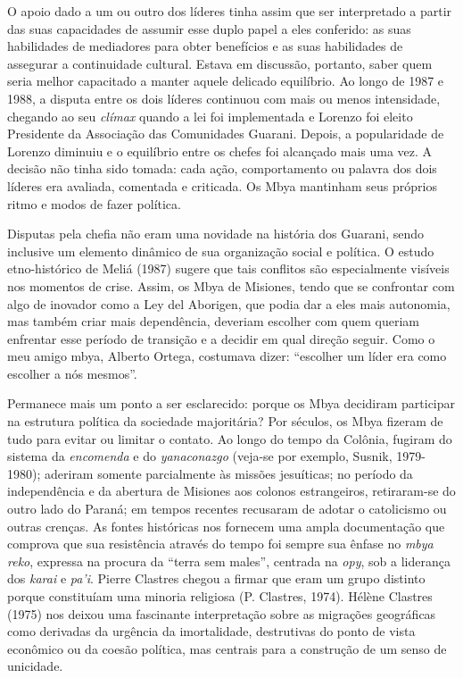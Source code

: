 O apoio dado a um ou outro dos líderes tinha assim que ser interpretado
a partir das suas capacidades de assumir esse duplo papel a eles
conferido: as suas habilidades de mediadores para obter benefícios e as
suas habilidades de assegurar a continuidade cultural. Estava em
discussão, portanto, saber quem seria melhor capacitado a manter aquele
delicado equilíbrio. Ao longo de 1987 e 1988, a disputa entre os dois
líderes continuou com mais ou menos intensidade, chegando ao seu
\emph{clímax} quando a lei foi implementada e Lorenzo foi eleito
Presidente da Associação das Comunidades Guarani. Depois, a popularidade
de Lorenzo diminuiu e o equilíbrio entre os chefes foi alcançado mais
uma vez. A decisão não tinha sido tomada: cada ação, comportamento ou
palavra dos dois líderes era avaliada, comentada e criticada. Os Mbya
mantinham seus próprios ritmo e modos de fazer política.

Disputas pela chefia não eram uma novidade na história dos Guarani,
sendo inclusive um elemento dinâmico de sua organização social e
política. O estudo etno-histórico de Meliá (1987) sugere que tais
conflitos são especialmente visíveis nos momentos de crise. Assim, os
Mbya de Misiones, tendo que se confrontar com algo de inovador como a
Ley del Aborigen, que podia dar a eles mais autonomia, mas também criar
mais dependência, deveriam escolher com quem queriam enfrentar esse
período de transição e a decidir em qual direção seguir. Como o meu
amigo mbya, Alberto Ortega, costumava dizer: ``escolher um líder era
como escolher a nós mesmos''.

Permanece mais um ponto a ser esclarecido: porque os Mbya decidiram
participar na estrutura política da sociedade majoritária? Por séculos,
os Mbya fizeram de tudo para evitar ou limitar o contato. Ao longo do
tempo da Colônia, fugiram do sistema da \emph{encomenda} e do
\emph{yanaconazgo} (veja-se por exemplo, Susnik, 1979-1980); aderiram
somente parcialmente às missões jesuíticas; no período da independência
e da abertura de Misiones aos colonos estrangeiros, retiraram-se do
outro lado do Paraná; em tempos recentes recusaram de adotar o
catolicismo ou outras crenças. As fontes históricas nos fornecem uma
ampla documentação que comprova que sua resistência através do tempo foi
sempre sua ênfase no \emph{mbya reko}, expressa na procura da ``terra
sem males'', centrada na \emph{opy}, sob a liderança dos \emph{karai} e
\emph{pa'i}. Pierre Clastres chegou a firmar que eram um grupo distinto
porque constituíam uma minoria religiosa (P. Clastres, 1974). Hélène
Clastres (1975) nos deixou uma fascinante interpretação sobre as
migrações geográficas como derivadas da urgência da imortalidade,
destrutivas do ponto de vista econômico ou da coesão política, mas
centrais para a construção de um senso de unicidade.

